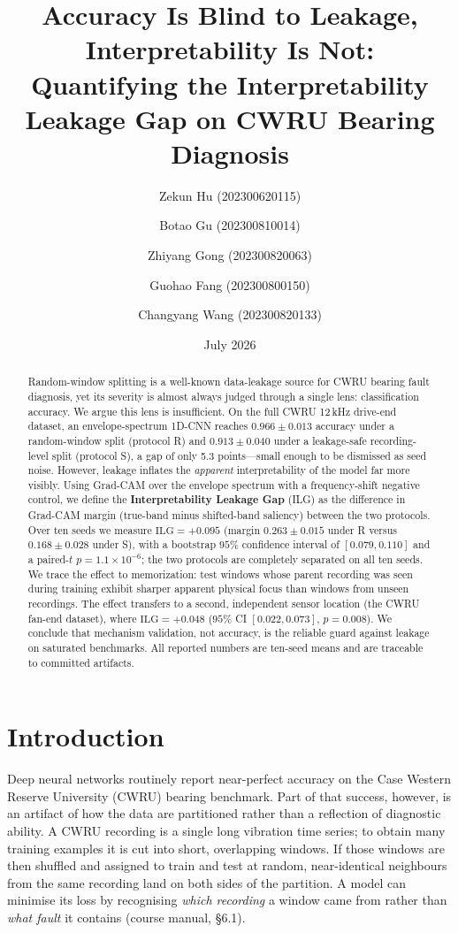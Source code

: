 \documentclass[11pt]{article}
\title{\textbf{Accuracy Is Blind to Leakage, Interpretability Is Not:\\
Quantifying the Interpretability Leakage Gap on CWRU Bearing Diagnosis}}
\author{
Zekun Hu (202300620115) \and
Botao Gu (202300810014) \and
Zhiyang Gong (202300820063) \and
Guohao Fang (202300800150) \and
Changyang Wang (202300820133)
}
\date{July 2026}
\begin{document}
\maketitle

\begin{abstract}
Random-window splitting is a well-known data-leakage source for CWRU bearing fault
diagnosis, yet its severity is almost always judged through a single lens: classification
accuracy. We argue this lens is insufficient. On the full CWRU 12\,kHz drive-end dataset,
an envelope-spectrum 1D-CNN reaches $0.966\pm0.013$ accuracy under a random-window split
(protocol R) and $0.913\pm0.040$ under a leakage-safe recording-level split (protocol S),
a gap of only 5.3 points---small enough to be dismissed as seed noise. However, leakage
inflates the \emph{apparent} interpretability of the model far more visibly. Using
Grad-CAM over the envelope spectrum with a frequency-shift negative control, we define the
\textbf{Interpretability Leakage Gap} (ILG) as the difference in Grad-CAM margin
(true-band minus shifted-band saliency) between the two protocols. Over ten seeds we
measure $\mathrm{ILG}=+0.095$ (margin $0.263\pm0.015$ under R versus $0.168\pm0.028$ under
S), with a bootstrap $95\%$ confidence interval of $[0.079, 0.110]$ and a paired-$t$
$p=1.1\times10^{-6}$; the two protocols are completely separated on all ten seeds. We
trace the effect to memorization: test windows whose parent recording was seen during
training exhibit sharper apparent physical focus than windows from unseen recordings. The
effect transfers to a second, independent sensor location (the CWRU fan-end dataset), where
$\mathrm{ILG}=+0.048$ ($95\%$ CI $[0.022, 0.073]$, $p=0.008$). We conclude that mechanism
validation, not accuracy, is the reliable guard against leakage on saturated benchmarks.
All reported numbers are ten-seed means and are traceable to committed artifacts.
\end{abstract}

\section{Introduction}
Deep neural networks routinely report near-perfect accuracy on the Case Western Reserve
University (CWRU) bearing benchmark. Part of that success, however, is an artifact of how
the data are partitioned rather than a reflection of diagnostic ability. A CWRU recording
is a single long vibration time series; to obtain many training examples it is cut into
short, overlapping windows. If those windows are then shuffled and assigned to train and
test at random, near-identical neighbours from the same recording land on both sides of
the partition. A model can minimise its loss by recognising \emph{which recording} a
window came from rather than \emph{what fault} it contains (course manual, \S6.1).
\end{document}
